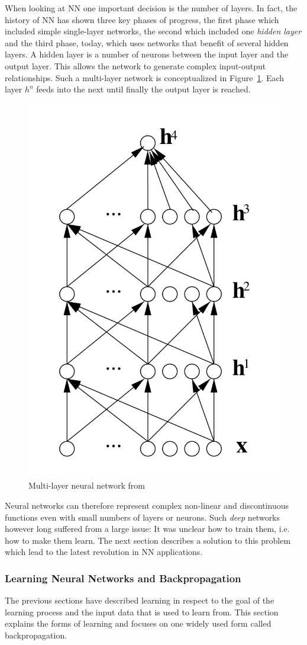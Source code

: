 When looking at \ac {NN} one important decision is the number of layers. In fact, the history of \acl{NN} has shown
three key phases of progress, the first phase which included simple single-layer networks, the second which included one
\emph{hidden layer} and the third phase, today, which uses networks that benefit of several hidden layers. A hidden
layer is a number of neurons between the input layer and the output layer. This allows the network to generate complex
input-output relationships. Such a multi-layer network is conceptualized in Figure~\ref{fig:multilayernn}. Each layer
$h^n$ feeds into the next until finally the output layer is reached. 

\begin{figure}[]
    \centering
    \includegraphics[width=0.3\linewidth]{img/multilayer_nn.png}
	\caption{Multi-layer neural network from \cite[]{bengio2009learning} }
    \label{fig:multilayernn}
\end{figure}

Neural networks can therefore represent complex non-linear and discontinuous functions
\cite[p.732]{russell2016artificial} even with small numbers of layers or neurons. Such \emph{deep} networks however long
suffered from a large issue: It was unclear how to train them, i.e. how to make them learn. The next section describes a
solution to this problem which lead to the latest revolution in \ac {NN} applications. 

\subsubsection{Learning Neural Networks and Backpropagation}
\label{sec:Backpropagation}


The previous sections have described learning in respect to the goal of the learning process and the input data that is
used to learn from. This section explains the forms of learning and focuses on one widely used form called
backpropagation. 

